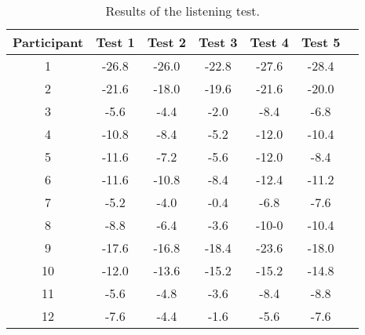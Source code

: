 \begin{table} [H]
	\centering
	\begin{tabular}{*{7}{c}}
		\hline
		Participant & Test 1 & Test 2 & Test 3  & Test 4  & Test 5  
		\\
		\hline
		1 & -26.8 & -26.0 &	-22.8 & -27.6 & -28.4 \\
		2 & -21.6 & -18.0 & -19.6  & -21.6  & -20.0 \\
		3 & -5.6 & -4.4 & -2.0 & -8.4 & -6.8  \\
		4 & -10.8 & -8.4 & -5.2 & -12.0 & -10.4 \\
		5 & -11.6 & -7.2 & -5.6	 & -12.0 & -8.4 \\
		6 & -11.6 & -10.8 & -8.4 & -12.4 & -11.2 \\
		7 & -5.2 & -4.0 & -0.4 & -6.8 & -7.6 \\
		8 & -8.8 & -6.4 & -3.6 & -10-0 & -10.4 \\
		9 & -17.6 & -16.8 & -18.4 & -23.6 & -18.0 \\
		10 & -12.0 & -13.6 & -15.2 & -15.2 & 	-14.8 \\
		11 & -5.6 & -4.8 & -3.6 & -8.4 & -8.8 \\
		12 & -7.6 & -4.4 & -1.6	 & -5.6 & 	-7.6   \\
		\hline
	\end{tabular}
	\caption{Results of the listening test. }
	\label{tab:ListeningResults}
\end{table}





